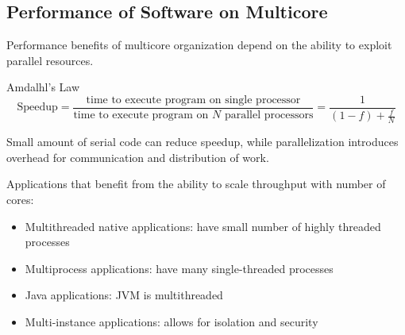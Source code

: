 \documentclass[11pt]{article}
\begin{document}
\subsection{Performance of Software on Multicore}
\label{sec:org2a760d9}
Performance benefits of multicore organization depend on
the ability to exploit parallel resources.

Amdalhl's Law
$$\text{Speedup} = \frac{\text{time to execute program on single processor}}{\text{time to execute program on $N$ parallel processors}} = \frac{1}{(1-f) + \frac{f}{N}}$$

Small amount of serial code can reduce speedup, while
parallelization introduces overhead for communication and distribution of work.

Applications that benefit from the ability to scale throughput with number of cores:
\begin{itemize}
\item Multithreaded native applications: have small number of highly threaded processes
\item Multiprocess applications: have many single-threaded processes
\item Java applications: JVM is multithreaded
\item Multi-instance applications: allows for isolation and security
\end{itemize}
\end{document}

